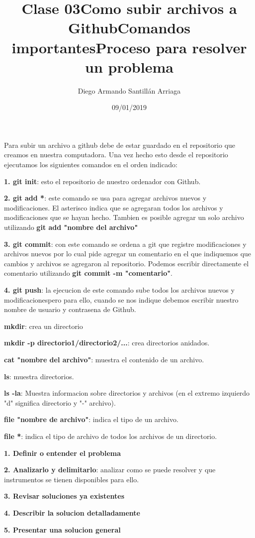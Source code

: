 \documentclass[letter paper, 12pt, oneside]{article}
\title{\Huge Clase 03}
\author{Diego Armando Santillán Arriaga}
\date{09/01/2019}
\begin{document}
	\maketitle
\newpage
\title{\huge\textbf{Como subir archivos a Github}}

Para subir un archivo a github debe de estar guardado en el repositorio que creamos en nuestra computadora. Una vez hecho esto desde el repositorio ejecutamos los siguientes comandos en el orden indicado:

 \textbf{1. git init}: esto el repositorio de nuestro ordenador con Github.

\textbf{2. git add *}: este comando se usa para agregar archivos nuevos y modificaciones. El asterisco indica que se agregaran todos los archivos y modificaciones que se hayan hecho. Tambien es posible agregar un solo archivo utilizando \textbf{git add "nombre del archivo"}
 

\textbf{3. git commit}: con este comando se ordena a git que registre modificaciones y archivos nuevos por lo cual pide agregar un comentario en el que indiquemos que cambios y archivos se agregaron al repositorio. Podemos escribir directamente el comentario utilizando \textbf{git commit -m "comentario"}. 

\textbf{4. git push}: la ejecucion de este comando sube todos los archivos nuevos y modificacionespero para ello, cuando se nos indique debemos escribir nuestro nombre de usuario y contrasena de Github.


\title{\huge\textbf{Comandos importantes}}


\textbf{mkdir}: crea un directorio


\textbf{mkdir -p directorio1/directorio2/...}: crea directorios anidados.


\textbf{cat "nombre del archivo"}: muestra el contenido de un archivo.


\textbf{ls}: muestra directorios.


\textbf{ls -la}: Muestra informacion sobre directorios y archivos (en el extremo izquierdo "d" significa directorio y "-" archivo).


\textbf{file "nombre de archivo"}: indica el tipo de un archivo. 

\textbf{file *}: indica el tipo de archivo de todos los archivos de un directorio. 


\title{\huge\textbf{Proceso para resolver un problema}}


\textbf{1. Definir o entender el problema}


\textbf{2. Analizarlo y delimitarlo}: analizar como se puede resolver y que instrumentos se tienen disponibles para ello.


\textbf{3. Revisar soluciones ya existentes}


\textbf{4. Describir la solucion detalladamente}


\textbf{5. Presentar una solucion general}
\end{document}
